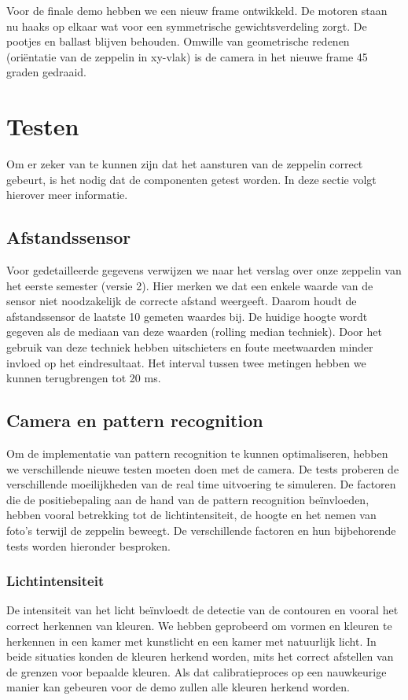 \documentclass[eind]{penoverslag}
\begin{document}
Voor de finale demo hebben we een nieuw frame ontwikkeld. De motoren staan nu haaks op elkaar wat voor een symmetrische gewichtsverdeling zorgt. De pootjes en ballast blijven behouden. Omwille van geometrische redenen (ori\"entatie van de zeppelin in xy-vlak) is de camera in het nieuwe frame 45 graden gedraaid. \\

\section{Testen}

Om er zeker van te kunnen zijn dat het aansturen van de zeppelin correct gebeurt, is het nodig dat de componenten getest worden. In deze sectie volgt hierover meer informatie.

\subsection{Afstandssensor}
Voor gedetailleerde gegevens verwijzen we naar het verslag over onze zeppelin van het eerste semester (versie 2). Hier merken we dat een enkele waarde van de sensor niet noodzakelijk de correcte afstand weergeeft. Daarom houdt de afstandssensor de laatste 10 gemeten waardes bij. De huidige hoogte wordt gegeven als de mediaan van deze waarden (rolling median techniek). Door het gebruik van deze techniek hebben uitschieters en foute meetwaarden minder invloed op het eindresultaat. Het interval tussen twee metingen hebben we kunnen terugbrengen tot 20 ms.\\

\subsection{Camera en pattern recognition}
Om de implementatie van pattern recognition te kunnen optimaliseren, hebben we verschillende nieuwe testen moeten doen met de camera. De tests proberen de verschillende moeilijkheden van de real time uitvoering te simuleren. De factoren die de positiebepaling aan de hand van de pattern recognition be\"invloeden, hebben vooral betrekking tot de lichtintensiteit, de hoogte en het nemen van foto’s terwijl de zeppelin beweegt. De verschillende factoren en hun bijbehorende tests worden hieronder besproken.

\subsubsection{Lichtintensiteit}
De intensiteit van het licht be\"{i}nvloedt de detectie van de contouren en vooral het correct herkennen van kleuren. We hebben geprobeerd om vormen en kleuren te herkennen in een kamer met kunstlicht en een kamer met natuurlijk licht. In beide situaties konden de kleuren herkend worden, mits het correct afstellen van de grenzen voor bepaalde kleuren. Als dat calibratieproces op een nauwkeurige manier kan gebeuren voor de demo zullen alle kleuren herkend worden.
\end{document}
